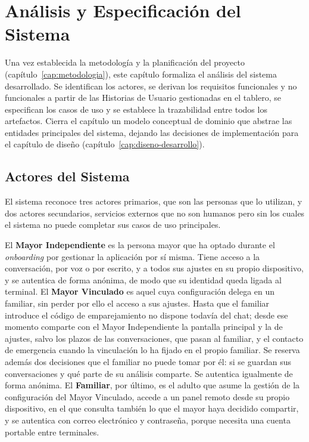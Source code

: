\chapter{Análisis y Especificación del Sistema}
\label{cap:analisis}

Una vez establecida la metodología y la planificación del proyecto (capítulo~\ref{cap:metodologia}), este capítulo
formaliza el análisis del sistema desarrollado. Se identifican los actores, se derivan los requisitos
funcionales y no funcionales a partir de las Historias de Usuario gestionadas en el tablero,
se especifican los casos de uso y se establece la trazabilidad entre todos los artefactos.
Cierra el capítulo un modelo conceptual de dominio que abstrae las entidades principales del sistema,
dejando las decisiones de implementación para el capítulo de diseño (capítulo~\ref{cap:diseno-desarrollo}).

\section{Actores del Sistema}

El sistema reconoce tres actores primarios, que son las personas que lo utilizan, y dos actores
secundarios, servicios externos que no son humanos pero sin los cuales el sistema no puede completar sus
casos de uso principales.

El \textbf{Mayor Independiente} es la persona mayor que ha optado durante el \textit{onboarding} por
gestionar la aplicación por sí misma. Tiene acceso a la conversación, por voz o por escrito, y a todos sus
ajustes en su propio dispositivo, y se autentica de forma anónima, de modo que su identidad queda ligada al
terminal. El
\textbf{Mayor Vinculado} es aquel cuya configuración delega en un familiar, sin perder por ello el acceso a
sus ajustes. Hasta que el familiar introduce el código de emparejamiento no dispone todavía del chat; desde
ese momento comparte con el Mayor Independiente la pantalla principal y la de ajustes, salvo los plazos de
las conversaciones, que pasan al familiar, y el contacto de emergencia cuando la vinculación lo ha fijado
en el propio familiar. Se reserva además dos decisiones que el familiar no puede tomar por él: si se
guardan sus conversaciones y qué parte de su análisis comparte. Se autentica igualmente de forma anónima.
El \textbf{Familiar}, por último, es el adulto que asume la gestión de la configuración del Mayor
Vinculado, accede a un panel remoto desde su propio dispositivo, en el que consulta también lo que el mayor
haya decidido compartir, y se autentica con correo electrónico y contraseña, porque necesita una cuenta
portable entre terminales.

